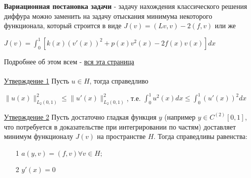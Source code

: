\documentclass[specialist, subf, href, colorlinks=true, 12pt, times, mtpro, final]{disser}
\theoremstyle{definition}
\begin{document}
{    \textbf{Вариационная постановка задачи} - задачу нахождения классического решения диффура можно заменить на задачу отыскания минимума некоторого функционала, который строится в виде $J(v) = (Lv,v) - 2(f,v)$ или же
    \begin{center}
    $J(v) = \int^1_0 [k(x)(v'(x))^2 + p(x)v^2(x) - 2f(x)v(x)]dx$
    \end{center}
    Подробнее об этом всем - \hyperlink {lects.97}{вся эта страница}\\
    \\
    \hyperlink {lects.98}{Утверждение 1} Пусть $u \in H$,  тогда справедливо
    \begin{center}
    $\|u(x)\|^2_{L_2(0,1)} \leq \|u'(x)\|^2_{L_2(0,1)}$, т.е. $\int^1_0 u^2(x)dx \leq \int^1_0 (u'(x))^2dx$
    \end{center}
    
   \hyperlink {lects.98}{Утверждение 2}
    Пусть достаточно гладкая функция
     $y$ (например $y \in C^{(2)}[0,1]$, что потребуется в доказательстве при интегрировании по частям) доставляет минимум функционалу $J(v)$ на пространстве $H$.  Тогда справедливы равенства:
    \begin{itemize}
    \item[1] $a(y,v) = (f,v) \forall v \in H;$
    \item[2]$y'(x) = 0$
    \end{itemize}
    
}
\end{document}
